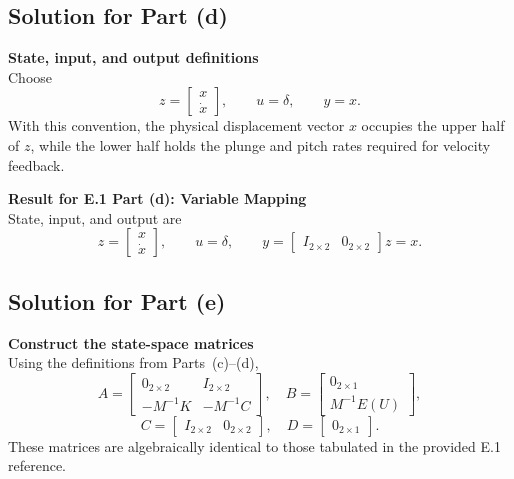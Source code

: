 \documentclass[12pt]{article}
\begin{document}
\subsection*{Solution for Part (d)}

\begin{stepbox}
\textbf{State, input, and output definitions}\\[0.5em]
Choose
\[
  z = \begin{bmatrix} x \\ \dot{x} \end{bmatrix}, \qquad
  u = \delta, \qquad
  y = x.
\]
With this convention, the physical displacement vector $x$ occupies the upper half of $z$, while the lower half holds the plunge and pitch rates required for velocity feedback.
\end{stepbox}

\begin{resultsbox}
\textbf{Result for E.1 Part (d): Variable Mapping}\\[0.5em]
State, input, and output are
\[
  z = \begin{bmatrix} x \\ \dot{x} \end{bmatrix}, \qquad
  u = \delta, \qquad
  y = \begin{bmatrix} I_{2\times2} & 0_{2\times2} \end{bmatrix} z = x.
\]
\end{resultsbox}

\subsection*{Solution for Part (e)}

\begin{stepbox}
\textbf{Construct the state-space matrices}\\[0.5em]
Using the definitions from Parts~(c)--(d),
\[
  A = \begin{bmatrix}
        0_{2\times 2} & I_{2\times 2} \\
        -M^{-1}K & -M^{-1}C
      \end{bmatrix},\quad
  B = \begin{bmatrix}
        0_{2\times 1} \\
        M^{-1}E(U)
      \end{bmatrix},
\]
\[
  C = \begin{bmatrix} I_{2\times 2} & 0_{2\times 2} \end{bmatrix},\quad
  D = \begin{bmatrix} 0_{2\times 1} \end{bmatrix}.
\]
These matrices are algebraically identical to those tabulated in the provided E.1 reference.
\end{stepbox}
\end{document}
